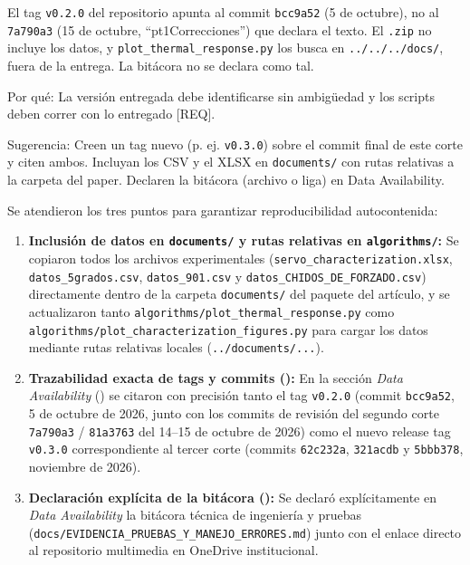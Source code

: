 \documentclass{LabDSTresponse}
\begin{document}
{El tag \texttt{v0.2.0} del repositorio apunta al commit \texttt{bcc9a52} (5 de octubre), no al \texttt{7a790a3} (15 de octubre, “pt1Correcciones”) que declara el texto. El \texttt{.zip} no incluye los datos, y \texttt{plot\_thermal\_response.py} los busca en \texttt{../../../docs/}, fuera de la entrega. La bitácora no se declara como tal.

Por qué: La versión entregada debe identificarse sin ambigüedad y los scripts deben correr con lo entregado [REQ].

Sugerencia: Creen un tag nuevo (p. ej. \texttt{v0.3.0}) sobre el commit final de este corte y citen ambos. Incluyan los CSV y el XLSX en \texttt{documents/} con rutas relativas a la carpeta del paper. Declaren la bitácora (archivo o liga) en Data Availability.}
{Se atendieron los tres puntos para garantizar reproducibilidad autocontenida:
\begin{enumerate}
    \item \textbf{Inclusión de datos en \texttt{documents/} y rutas relativas en \texttt{algorithms/}:} Se copiaron todos los archivos experimentales (\texttt{servo\_characterization.xlsx}, \texttt{datos\_5grados.csv}, \texttt{datos\_901.csv} y \texttt{datos\_CHIDOS\_DE\_FORZADO.csv}) directamente dentro de la carpeta \texttt{documents/} del paquete del artículo, y se actualizaron tanto \texttt{algorithms/plot\_thermal\_response.py} como \texttt{algorithms/plot\_characterization\_figures.py} para cargar los datos mediante rutas relativas locales (\texttt{../documents/...}).
    \item \textbf{Trazabilidad exacta de tags y commits ():} En la sección \textit{Data Availability} () se citaron con precisión tanto el tag \texttt{v0.2.0} (commit \texttt{bcc9a52}, 5 de octubre de 2026, junto con los commits de revisión del segundo corte \texttt{7a790a3} / \texttt{81a3763} del 14--15 de octubre de 2026) como el nuevo release tag \texttt{v0.3.0} correspondiente al tercer corte (commits \texttt{62c232a}, \texttt{321acdb} y \texttt{5bbb378}, noviembre de 2026).
    \item \textbf{Declaración explícita de la bitácora ():} Se declaró explícitamente en \textit{Data Availability} la bitácora técnica de ingeniería y pruebas (\texttt{docs/EVIDENCIA\_PRUEBAS\_Y\_MANEJO\_ERRORES.md}) junto con el enlace directo al repositorio multimedia en OneDrive institucional.
\end{enumerate}}
\end{document}
